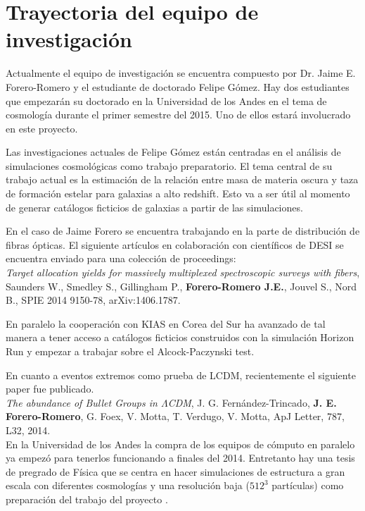 
\section{Trayectoria del equipo de investigaci\'on}

Actualmente el equipo de investigaci\'on se encuentra compuesto por
Dr. Jaime E. Forero-Romero y el estudiante de doctorado Felipe
G\'omez. Hay dos estudiantes que empezar\'an su doctorado en la
Universidad de los Andes en el tema de cosmolog\'ia durante el primer
semestre del 2015. Uno de ellos estar\'a involucrado en este proyecto.  

Las investigaciones actuales de Felipe G\'omez est\'an centradas en el
an\'alisis de simulaciones cosmol\'ogicas como trabajo
preparatorio. El tema central de su trabajo actual es la estimaci\'on
de la relaci\'on entre masa de materia oscura y taza de formaci\'on
estelar para galaxias a alto redshift. Esto va a ser \'util al momento
de generar cat\'alogos ficticios de galaxias a partir de las
simulaciones.  

En el caso de Jaime Forero se encuentra trabajando en la parte de
distribuci\'on de fibras \'opticas. El siguiente art\'iculos en
colaboraci\'on con cient\'ificos de DESI se encuentra enviado para una
colecci\'on de proceedings:\\ 


{\it Target allocation yields for massively multiplexed
  spectroscopic surveys with fibers}, Saunders W., Smedley S.,
  Gillingham P., {\bf Forero-Romero J.E.}, Jouvel S., Nord B., 
  SPIE 2014 9150-78, arXiv:1406.1787.


En paralelo la cooperaci\'on con KIAS en Corea del Sur ha avanzado de
tal manera a tener acceso a cat\'alogos ficticios construidos con la
simulaci\'on Horizon Run y empezar a trabajar sobre el
Alcock-Paczynski test. 

En cuanto a eventos extremos como prueba de LCDM, recientemente el
siguiente paper fue publicado.\\ 

{\it The abundance of Bullet Groups in $\Lambda$CDM},
  J. G. Fern\'andez-Trincado, {\bf J. E. Forero-Romero}, G. Foex,
  V. Motta, T. Verdugo, V. Motta, ApJ Letter, 787, L32, 2014.\\

En la Universidad de los Andes la compra de los equipos de c\'omputo
en paralelo ya empez\'o para tenerlos funcionando a finales del
2014. Entretanto hay una tesis de pregrado de F\'isica que se centra
en hacer simulaciones de estructura a gran escala con diferentes
cosmolog\'ias y una resoluci\'on baja ($512^3$ part\'iculas) como
preparaci\'on del trabajo del proyecto \coco. 


